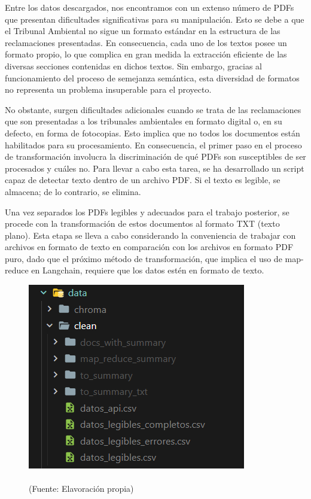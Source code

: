 \par Entre los datos descargados, nos encontramos con un extenso número de PDFs que presentan dificultades significativas para su 
manipulación. Esto se debe a que el Tribunal Ambiental no sigue un formato estándar en la estructura de las reclamaciones 
presentadas. En consecuencia, cada uno de los textos posee un formato propio, lo que complica en gran medida la extracción 
eficiente de las diversas secciones contenidas en dichos textos. Sin embargo, gracias al funcionamiento del proceso de semejanza 
semántica, esta diversidad de formatos no representa un problema insuperable para el proyecto.

\par No obstante, surgen dificultades adicionales cuando se trata de las reclamaciones que son presentadas a los tribunales ambientales 
en formato digital o, en su defecto, en forma de fotocopias. Esto implica que no todos los documentos están habilitados para su 
procesamiento. En consecuencia, el primer paso en el proceso de transformación involucra la discriminación de qué PDFs son 
susceptibles de ser procesados y cuáles no. Para llevar a cabo esta tarea, se ha desarrollado un script capaz de detectar 
texto dentro de un archivo PDF. Si el texto es legible, se almacena; de lo contrario, se elimina.

\par Una vez separados los PDFs legibles y adecuados para el trabajo posterior, se procede con la transformación de estos documentos 
al formato TXT (texto plano). Esta etapa se lleva a cabo considerando la conveniencia de trabajar con archivos en formato de 
texto en comparación con los archivos en formato PDF puro, dado que el próximo método de transformación, que implica el uso de
 map-reduce en Langchain, requiere que los datos estén en formato de texto.

 \begin{figure}[ht!]
    \centering
    \includegraphics[width=.5\textwidth]{figures/huemulFOLDERS.png}
    \caption[]{\\
    {\scriptsize (Fuente: Elavoración propia)}}
    \label{fig:chatbot1}
\end{figure}

